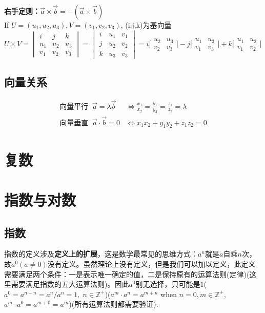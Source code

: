 \documentclass[../main.tex]{subfiles}
\begin{document}
\textbf{右手定则：}$\vec{a} \times \vec{b} = -(\vec{a} \times \vec{b})$\\
If $ U = (u_1,u_2,u_3), V = (v_1,v_2,v_3)$, (i,j,k)为基向量\\
$
U \times V =
\begin{vmatrix}
  i & j & k\\
  u_1 & u_2 & u_3\\
  v_1 & v_2 & v_3
\end{vmatrix}
=
\begin{vmatrix}
  i & u_1 & v_1\\
  j & u_2 & v_2\\
  k & u_3 & v_3
\end{vmatrix}
=
i\bigl[\begin{smallmatrix} u_2&u_3\\v_2&v_3 \end{smallmatrix} \bigr]-
j\bigl[\begin{smallmatrix} u_1&u_3\\v_1&v_3 \end{smallmatrix} \bigr]+
k\bigl[\begin{smallmatrix} u_1&u_2\\v_1&v_2 \end{smallmatrix} \bigr]
$

\subsection{向量关系}
{
  \setlength{\mathindent}{0em}
  \[
\begin{array}{ll}
  \text{向量平行} \;\; \vec{a}=\lambda\vec{b}&\displaystyle \Leftrightarrow \frac{x_1}{x_2}=\frac{y_1}{y_{2}}=\frac{z_1}{z_2} = \lambda \\
  \text{向量垂直} \;\; \vec{a}\cdot\vec{b}=0&\Leftrightarrow x_1x_2+y_1y_2+z_1z_2=0
\end{array}
\]
}
\clearpage

\section{复数}


\clearpage
\section{指数与对数}
\subsection{指数}
指数的定义涉及\textbf{定义上的扩展}，这是数学最常见的思维方式：$a^n$就是$a$自乘$n$次，故$a^0(a\neq 0)$没有定义。虽然理论上没有定义，但是我们可以加以定义，此定义需要满足两个条件：一是表示唯一确定的值，二是保持原有的运算法则(定律)(这里需要满足指数的五大运算法则)。因此$a^0$别无选择，只可能是$1$($a^0=a^{n-n}=a^n/a^n=1, \; n\in \mathbb{Z^+}$)($a^m\cdot a^n=a^{m+n}$ when $n=0, m\in \mathbb{Z^+}$, $a^m\cdot a^0 = a^{m+0}=a^m$)(所有运算法则都需要验证).
\end{document}
